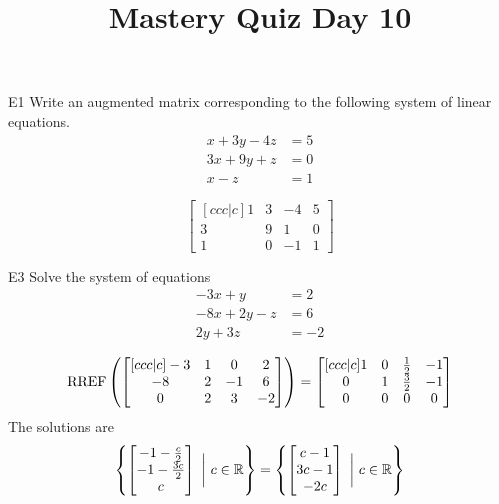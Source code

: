\documentclass{sbgLAquiz}
\title{Mastery Quiz Day 10 }
\begin{document}
\begin{problem}{E1}
Write an augmented matrix corresponding to the following system of linear equations.
\begin{align*}
x+3y-4z &= 5 \\
3x+9y+z &= 0 \\
x-z &= 1
\end{align*}
\end{problem}
\begin{solution}
$$\begin{bmatrix}[ccc|c]
1 & 3 & -4 & 5 \\
3 & 9 & 1 & 0 \\
1 & 0 & -1 & 1 
\end{bmatrix}$$
\end{solution}

\begin{problem}{E3}
Solve the system of equations
\begin{align*}
-3x +y &= 2\\
-8x+2y-z &= 6 \\
2y+3z &= -2
\end{align*}


\end{problem}

\begin{solution}
$$\operatorname{RREF}\left(\begin{bmatrix}[ccc|c] -3 & 1 & 0 & 2 \\ -8 & 2 & -1 & 6 \\ 0 & 2 & 3 & -2 \end{bmatrix} \right) = \begin{bmatrix}[ccc|c] 1 & 0 & \frac{1}{2} & -1 \\ 0 & 1 & \frac{3}{2} & -1 \\ 0 & 0 & 0 & 0 \end{bmatrix}$$
The solutions are $$\left\{ \begin{bmatrix} -1-\frac{c}{2} \\ -1-\frac{3c}{2} \\ c \end{bmatrix}\ \bigg|\ c\in \mathbb{R}\right\} = \left\{ \begin{bmatrix} c-1 \\ 3c-1 \\ -2c  \end{bmatrix}\ \bigg|\ c\in \mathbb{R}\right\}$$
\end{solution}
\end{document}
